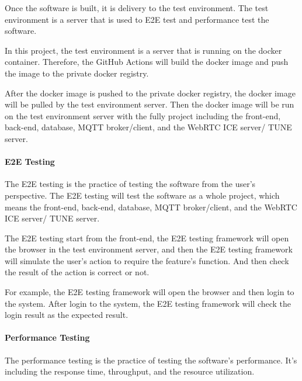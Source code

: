 Once the software is built, it is delivery to the test environment. 
The test environment is a server that is used to E2E test and performance test the software.

In this project, the test environment is a server that is running on the docker container.
Therefore, the GitHub Actions will build the docker image and push the image to the private docker registry.

After the docker image is pushed to the private docker registry, 
the docker image will be pulled by the test environment server.
Then the docker image will be run on the test environment server 
with the fully project including the front-end, back-end, database, MQTT broker/client, and the WebRTC ICE server/ TUNE server.

\paragraph{E2E Testing}

The E2E testing is the practice of testing the software from the user's perspective.
The E2E testing will test the software as a whole project, 
which means the front-end, back-end, database, MQTT broker/client, and the WebRTC ICE server/ TUNE server.

The E2E testing start from the front-end, the E2E testing framework will open the browser in the test environment server,
and then the E2E testing framework will simulate the user's action to require the feature's function.
And then check the result of the action is correct or not.

For example, the E2E testing framework will open the browser and then login to the system.
After login to the system, the E2E testing framework will check the login result as the expected result.

\paragraph{Performance Testing}

The performance testing is the practice of testing the software's performance.
It's including the response time, throughput, and the resource utilization.


